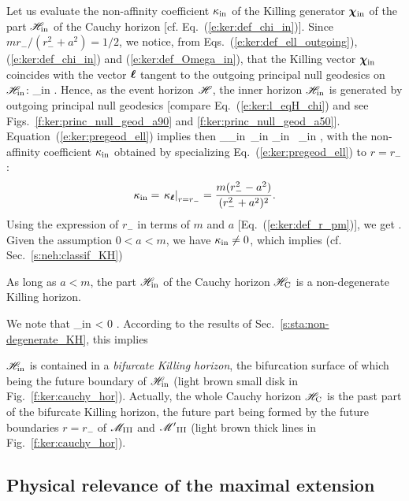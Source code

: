 Let us evaluate the non-affinity coefficient $\kappa_{\rm in}$ of the Killing
generator $\bm{\chi}_{\rm in}$ of the part $\mathscr{H}_{\rm in}$ of the
Cauchy horizon [cf. Eq.~(\ref{e:ker:def_chi_in})].
Since $m r_- /(r_-^2+a^2) = 1/2$,
we notice, from Eqs.~(\ref{e:ker:def_ell_outgoing}), (\ref{e:ker:def_chi_in}) and (\ref{e:ker:def_Omega_in}), that the Killing vector $\bm{\chi}_{\rm in}$ coincides with
the vector $\bm{\ell}$ tangent to the outgoing principal
null geodesics on $\mathscr{H}_{\rm in}$:
\be \label{e:ker:chi_in_ell}
    \w{\chi}_{\rm in}  \wl .
\ee
Hence, as the event horizon $\mathscr{H}$, the inner horizon $\mathscr{H}_{\rm in}$
is generated by outgoing principal null geodesics [compare Eq.~(\ref{e:ker:l_eqH_chi}) and
see Figs.~\ref{f:ker:princ_null_geod_a90} and \ref{f:ker:princ_null_geod_a50}].
Equation~(\ref{e:ker:pregeod_ell}) implies then
\be
     \wnab_{\w{\chi}_{\rm in}}\, \w{\chi}_{\rm in}  \kappa_{\rm in} \, \w{\chi}_{\rm in} ,
\ee
with the non-affinity coefficient $\kappa_{\rm in}$ obtained by specializing
Eq.~(\ref{e:ker:pregeod_ell}) to $r=r_-$:
\[
    \kappa_{\rm in} = \left. \kappa_{\bm{\ell}} \right| _{r=r_-} =
    \frac{m(r_-^2-a^2)}{(r_-^2+a^2)^2} .
\]
Using the expression of $r_-$ in terms of $m$ and $a$ [Eq.~(\ref{e:ker:def_r_pm})], we get
\be
     .
\ee
Given the assumption $0<a<m$, we have $\kappa_{\rm in} \not=0$, which implies
(cf. Sec.~\ref{s:neh:classif_KH})
\begin{prop}
As long as $a<m$, the part $\mathscr{H}_{\rm in}$ of the Cauchy horizon $\mathscr{H}_{\rm C}$ is a non-degenerate Killing horizon.
\end{prop}
We note that
\be
    \kappa_{\rm in} < 0 .
\ee
According to the results of Sec.~\ref{s:sta:non-degenerate_KH}, this implies
\begin{prop}
$\mathscr{H}_{\rm in}$ is contained in a \emph{bifurcate Killing horizon}, the
bifurcation surface of which being the future boundary of $\mathscr{H}_{\rm in}$
(light brown small disk in Fig.~\ref{f:ker:cauchy_hor}).
Actually, the whole Cauchy horizon $\mathscr{H}_{\rm C}$ is the past part of the bifurcate Killing horizon,
the future part being formed by the future
boundaries $r=r_-$ of $\mathscr{M}_{\rm III}$ and ${\mathscr{M}'}_{\rm III}$ (light brown thick lines in Fig.~\ref{f:ker:cauchy_hor}).
\end{prop}

\subsection{Physical relevance of the maximal extension}

